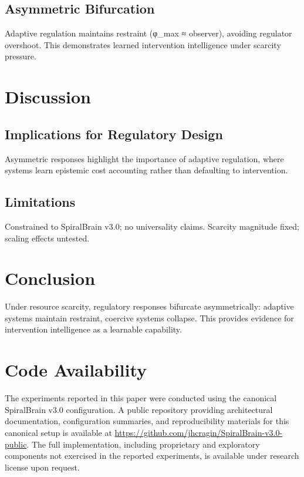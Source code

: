 \documentclass[12pt,a4paper]{report}
\begin{document}
\subsection{Asymmetric Bifurcation}

Adaptive regulation maintains restraint (φ_max ≈ observer), avoiding regulator overshoot. This demonstrates learned intervention intelligence under scarcity pressure.

\section{Discussion}

\subsection{Implications for Regulatory Design}

Asymmetric responses highlight the importance of adaptive regulation, where systems learn epistemic cost accounting rather than defaulting to intervention.

\subsection{Limitations}

Constrained to SpiralBrain v3.0; no universality claims. Scarcity magnitude fixed; scaling effects untested.

\section{Conclusion}

Under resource scarcity, regulatory responses bifurcate asymmetrically: adaptive systems maintain restraint, coercive systems collapse. This provides evidence for intervention intelligence as a learnable capability.

\section{Code Availability}

The experiments reported in this paper were conducted using the canonical SpiralBrain v3.0 configuration. A public repository providing architectural documentation, configuration summaries, and reproducibility materials for this canonical setup is available at \url{https://github.com/jhcragin/SpiralBrain-v3.0-public}. The full implementation, including proprietary and exploratory components not exercised in the reported experiments, is available under research license upon request.



\end{document}
